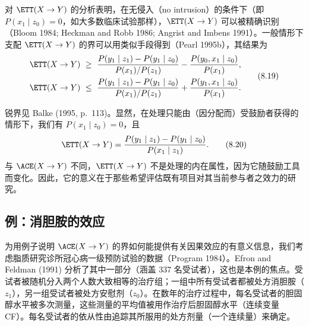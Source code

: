 对 $\ETT(X\to Y)$ 的分析表明，在无侵入（no intrusion）的条件下（即 $P(x_1\mid z_0)=0$，如大多数临床试验那样），$\ETT(X\to Y)$ 可以被精确识别（Bloom 1984; Heckman and Robb 1986; Angrist and Imbens 1991）。一般情形下支配 $\ETT(X\to Y)$ 的界可以用类似手段得到（Pearl 1995b），其结果为
\begin{equation}
\begin{aligned}
\ETT(X\to Y)&\ \ge\ \frac{P(y_1\mid z_1)-P(y_1\mid z_0)}{P(x_1)/P(z_1)}-\frac{P(y_0,x_1\mid z_0)}{P(x_1)},\\
\ETT(X\to Y)&\ \le\ \frac{P(y_1\mid z_1)-P(y_1\mid z_0)}{P(x_1)/P(z_1)}+\frac{P(y_1,x_1\mid z_0)}{P(x_1)}.
\end{aligned} \tag{8.19}
\end{equation}

锐界见 Balke (1995, p.~113)。显然，在处理只能由（因分配而）受鼓励者获得的情形下，我们有 $P(x_1\mid z_0)=0$，且
\begin{equation}
\ETT(X\to Y)=\frac{P(y_1\mid z_1)-P(y_1\mid z_0)}{P(x_1\mid z_1)}. \tag{8.20}
\end{equation}
与 $\ACE(X\to Y)$ 不同，$\ETT(X\to Y)$ 不是处理的内在属性，因为它随鼓励工具而变化。因此，它的意义在于那些希望评估既有项目对其当前参与者之效力的研究。

\subsection{例：消胆胺的效应}

为用例子说明 $\ACE(X\to Y)$ 的界如何能提供有关因果效应的有意义信息，我们考虑脂质研究诊所冠心病一级预防试验的数据（Program 1984）。Efron and Feldman (1991) 分析了其中一部分（涵盖 337 名受试者），这也是本例的焦点。受试者被随机分入两个人数大致相等的治疗组；一组中所有受试者都被处方消胆胺（$z_1$），另一组受试者被处方安慰剂（$z_0$）。在数年的治疗过程中，每名受试者的胆固醇水平被多次测量，这些测量的平均值被用作治疗后胆固醇水平（连续变量 CF）。每名受试者的依从性由追踪其所服用的处方剂量（一个连续量）来确定。

